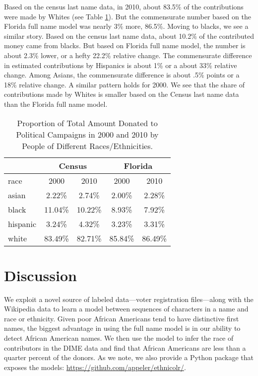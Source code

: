 \documentclass[12pt, letterpaper]{article}
\begin{document}
Based on the census last name data, in 2010, about 83.5\% of the contributions were made by Whites (see Table \ref{table:percentage_contrib_by_race}). But the commensurate number based on the Florida full name model was nearly 3\% more, 86.5\%. Moving to blacks, we see a similar story. Based on the census last name data, about 10.2\% of the contributed money came from blacks. But based on Florida full name model, the number is about 2.3\% lower, or a hefty 22.2\% relative change. The commensurate difference in estimated contributions by Hispanics is about 1\% or a about 33\% relative change. Among Asians, the commensurate difference is about .5\% points or a 18\% relative change. A similar pattern holds for 2000. We see that the share of contributions made by Whites is smaller based on the Census last name data than the Florida full name model.

\begin{table}[h!]
\centering
\caption{Proportion of Total Amount Donated to Political Campaigns in 2000 and 2010 by People of Different Races/Ethnicities.}
\begin{tabular}{ l c c c c}
\hline
         & \multicolumn{2}{c}{Census} & \multicolumn{2}{c}{Florida}\\
\hline
race     &     2000     & 2010     &    2000    & 2010\\    
\hline
asian    &     2.22\%   & 2.74\%   &   2.00\%   & 2.28\%\\
black    &     11.04\%  & 10.22\%  &   8.93\%   & 7.92\%\\
hispanic &     3.24\%   & 4.32\%   &   3.23\%   & 3.31\%\\
white    &     83.49\%  & 82.71\%  &   85.84\%  & 86.49\%\\
\hline
\end{tabular}
\label{table:percentage_contrib_by_race}
\end{table}

\section*{Discussion}
We exploit a novel source of labeled data---voter registration files---along with the Wikipedia data to learn a model between sequences of characters in a name and race or ethnicity. Given poor African Americans tend to have distinctive first names, the biggest advantage in using the full name model is in our ability to detect African American names. We then use the model to infer the race of contributors in the DIME data and find that African Americans are less than a quarter percent of the donors. As we note, we also provide a Python package that exposes the models: \url{https://github.com/appeler/ethnicolr/}.
\end{document}
